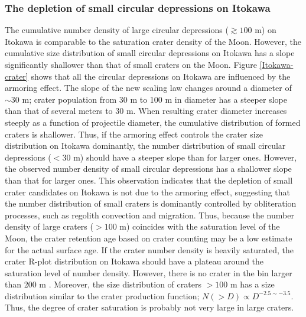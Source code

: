 \documentclass[3p,authoryear]{elsarticle}
\begin{document}
 \subsubsection{The depletion of small circular depressions on Itokawa} 
The cumulative number density of large circular depressions ($\gtrsim 100$ m) on Itokawa is comparable to the saturation crater density of the Moon. However, the cumulative size distribution of small circular depressions on Itokawa has a slope significantly shallower than that of small craters on the Moon. Figure \ref{Itokawa-crater} shows that all the circular depressions on Itokawa are influenced by the armoring effect. The slope of the new scaling law changes around a diameter of $\sim 30$ m; crater population from 30 m to 100 m in diameter has a steeper slope than that of several meters to 30 m. When resulting crater diameter increases steeply as a function of projectile diameter, the cumulative distribution of formed craters is shallower.  Thus, if the armoring effect controls the crater size distribution on Itokawa dominantly, the number distribution of small circular depressions ($< 30$ m) should have a steeper slope than for larger ones. However, the observed number density of small circular depressions has a shallower slope than that for larger ones. This observation indicates that the depletion of small crater candidates on Itokawa is not due to the armoring effect, suggesting that the number distribution of small craters is dominantly controlled by obliteration processes, such as regolith convection and migration. Thus, because the number density of large craters ($>100$ m) coincides with the saturation level of the Moon, the crater retention age based on crater counting may be a low estimate for the actual surface age. If the crater number density is heavily saturated, the crater R-plot distribution on Itokawa should have a plateau around the saturation level of number density. However, there is no crater in the bin larger than 200 m \citep{hirata2009}. Moreover, the size distribution of craters $>100$ m has a size distribution similar to the crater production function; $N(>D)\propto D^{-2.5\sim -3.5}$. Thus, the degree of crater saturation is probably not very large in large craters. 

\end{document}
